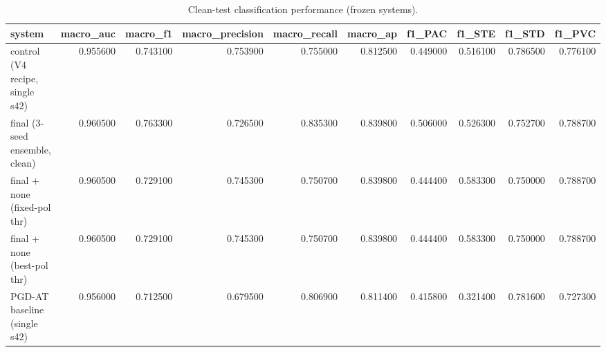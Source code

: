 \begin{table}[htbp]\centering\caption{Clean-test classification performance (frozen systems).}\label{tab:clean}
\begin{tabular}{lrrrrrrrrr}
\toprule
system & macro_auc & macro_f1 & macro_precision & macro_recall & macro_ap & f1_PAC & f1_STE & f1_STD & f1_PVC \\
\midrule
control (V4 recipe, single s42) & 0.955600 & 0.743100 & 0.753900 & 0.755000 & 0.812500 & 0.449000 & 0.516100 & 0.786500 & 0.776100 \\
final (3-seed ensemble, clean) & 0.960500 & 0.763300 & 0.726500 & 0.835300 & 0.839800 & 0.506000 & 0.526300 & 0.752700 & 0.788700 \\
final + none (fixed-pol thr) & 0.960500 & 0.729100 & 0.745300 & 0.750700 & 0.839800 & 0.444400 & 0.583300 & 0.750000 & 0.788700 \\
final + none (best-pol thr) & 0.960500 & 0.729100 & 0.745300 & 0.750700 & 0.839800 & 0.444400 & 0.583300 & 0.750000 & 0.788700 \\
PGD-AT baseline (single s42) & 0.956000 & 0.712500 & 0.679500 & 0.806900 & 0.811400 & 0.415800 & 0.321400 & 0.781600 & 0.727300 \\
\bottomrule
\end{tabular}
\end{table}
